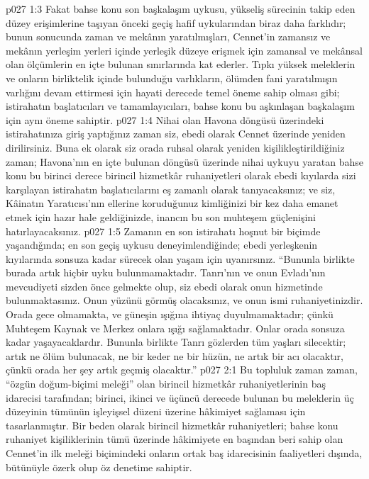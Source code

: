 \vs p027 1:3 Fakat bahse konu son başkalaşım uykusu, yükseliş sürecinin takip eden düzey erişimlerine taşıyan önceki geçiş hafif uykularından biraz daha farklıdır; bunun sonucunda zaman ve mekânın yaratılmışları, Cennet’in zamansız ve mekânın yerleşim yerleri içinde yerleşik düzeye erişmek için zamansal ve mekânsal olan ölçümlerin en içte bulunan sınırlarında kat ederler. Tıpkı yüksek meleklerin ve onların birliktelik içinde bulunduğu varlıkların, ölümden fani yaratılmışın varlığını devam ettirmesi için hayati derecede temel öneme sahip olması gibi; istirahatın başlatıcıları ve tamamlayıcıları, bahse konu bu aşkınlaşan başkalaşım için aynı öneme sahiptir.
\vs p027 1:4 Nihai olan Havona döngüsü üzerindeki istirahatınıza giriş yaptığınız zaman siz, ebedi olarak Cennet üzerinde yeniden dirilirsiniz. Buna ek olarak siz orada ruhsal olarak yeniden kişilikleştirildiğiniz zaman; Havona’nın en içte bulunan döngüsü üzerinde nihai uykuyu yaratan bahse konu bu birinci derece birincil hizmetkâr ruhaniyetleri olarak ebedi kıyılarda sizi karşılayan istirahatın başlatıcılarını eş zamanlı olarak tanıyacaksınız; ve siz, Kâinatın Yaratıcısı’nın ellerine koruduğunuz kimliğinizi bir kez daha emanet etmek için hazır hale geldiğinizde, inancın bu son muhteşem güçlenişini hatırlayacaksınız.
\vs p027 1:5 Zamanın en son istirahatı hoşnut bir biçimde yaşandığında; en son geçiş uykusu deneyimlendiğinde; ebedi yerleşkenin kıyılarında sonsuza kadar sürecek olan yaşam için uyanırsınız. “Bununla birlikte burada artık hiçbir uyku bulunmamaktadır. Tanrı’nın ve onun Evladı’nın mevcudiyeti sizden önce gelmekte olup, siz ebedi olarak onun hizmetinde bulunmaktasınız. Onun yüzünü görmüş olacaksınız, ve onun ismi ruhaniyetinizdir. Orada gece olmamakta, ve güneşin ışığına ihtiyaç duyulmamaktadır; çünkü Muhteşem Kaynak ve Merkez onlara ışığı sağlamaktadır. Onlar orada sonsuza kadar yaşayacaklardır. Bununla birlikte Tanrı gözlerden tüm yaşları silecektir; artık ne ölüm bulunacak, ne bir keder ne bir hüzün, ne artık bir acı olacaktır, çünkü orada her şey artık geçmiş olacaktır.”
\vs p027 2:1 Bu topluluk zaman zaman, “özgün doğum\hyp{}biçimi meleği” olan birincil hizmetkâr ruhaniyetlerinin baş idarecisi tarafından; birinci, ikinci ve üçüncü derecede bulunan bu meleklerin üç düzeyinin tümünün işleyişsel düzeni üzerine hâkimiyet sağlaması için tasarlanmıştır. Bir beden olarak birincil hizmetkâr ruhaniyetleri; bahse konu ruhaniyet kişiliklerinin tümü üzerinde hâkimiyete en başından beri sahip olan Cennet’in ilk meleği biçimindeki onların ortak baş idarecisinin faaliyetleri dışında, bütünüyle özerk olup öz denetime sahiptir.
